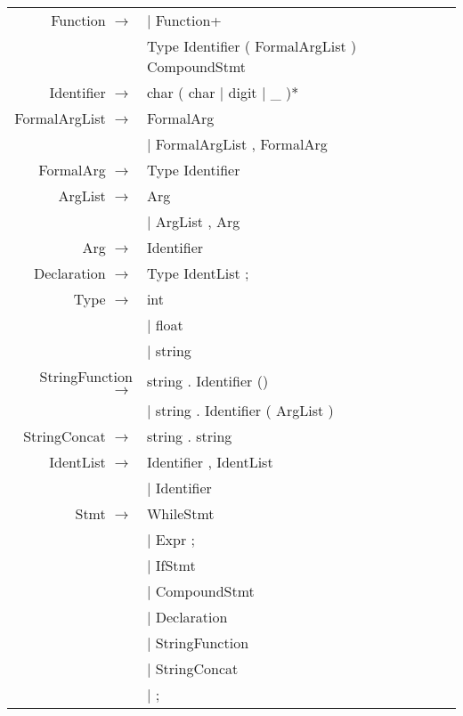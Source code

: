 \documentclass[12pt]{article}
\begin{document}
\begin{longtable}{ r l }
	Function 		$\rightarrow$ 	& $|$ Function+ \\
									& Type Identifier ( FormalArgList ) CompoundStmt \\
	Identifier		$\rightarrow$   & char ( char $|$ digit $|$ \_ )* \\
	FormalArgList 	$\rightarrow$ 	& FormalArg \\
									& $|$ FormalArgList , FormalArg \\
	FormalArg 		$\rightarrow$ 	& Type Identifier \\
	ArgList			$\rightarrow$ 	& Arg \\
									& $|$ ArgList , Arg \\
	Arg				$\rightarrow$ 	& Identifier \\
	Declaration		$\rightarrow$ 	& Type IdentList ; \\
	Type			$\rightarrow$ 	& int \\
									& $|$ float \\
									& $|$ string \\
	StringFunction	$\rightarrow$	& string . Identifier () \\
									& $|$ string . Identifier ( ArgList ) \\
	StringConcat	$\rightarrow$	& string . string \\
	IdentList		$\rightarrow$ 	& Identifier , IdentList \\
									& $|$ Identifier \\
	Stmt 			$\rightarrow$ 	& WhileStmt \\
									& $|$ Expr ; \\
									& $|$ IfStmt \\
									& $|$ CompoundStmt \\
									& $|$ Declaration \\
									& $|$ StringFunction \\
									& $|$ StringConcat \\
									& $|$ ; \\

\end{longtable}
\end{document}
